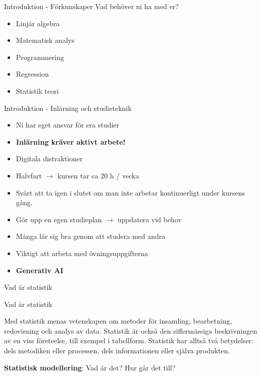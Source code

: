 \documentclass[10pt,english]{beamer}
\begin{document}
\begin{frame}{Introduktion - Förkunskaper}
    Vad behöver ni ha med er?
    \begin{itemize}
        \item Linjär algebra
        \item Matematisk analys
        \item Programmering
        \item Regression
        \item Statistik teori
    \end{itemize}
\end{frame}

\begin{frame}{Introduktion - Inlärning och studieteknik}
    
    \begin{itemize}
        \item Ni har eget ansvar för era studier
        \item \textbf{Inlärning kräver aktivt arbete!}
        \item Digitala distraktioner
        \item Halvfart $\rightarrow$ kursen tar ca 20 h / vecka
        \item Svårt att ta igen i slutet om man inte arbetar kontinuerligt under kursens gång.
        \item Gör upp en egen studieplan $\rightarrow$ uppdatera vid behov
        \item Många lär sig bra genom att studera med andra
        \item Viktigt att arbeta med övningsuppgifterna
        \item \textbf{Generativ AI}
    \end{itemize}
\end{frame}

\begin{frame}{Vad är statistik}

\end{frame}

\begin{frame}{Vad är statistik}
    \begin{bluebox}
        Med statistik menas vetenskapen om metoder för insamling, bearbetning, redovisning och analys av data. Statistik är också den siffermässiga beskrivningen av en viss företeelse, till exempel i tabellform. Statistik har alltså två betydelser: dels metodiken eller processen, dels informationen eller själva produkten.
    \end{bluebox}
    \vspace{1.5cm}
     \textbf{Statistisk modellering}: Vad är det? Hur går det till?
\end{frame}
\end{document}
